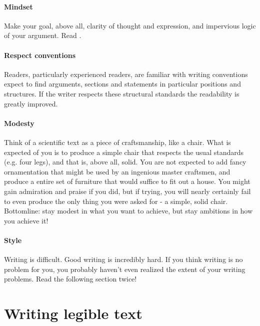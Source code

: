 \documentclass{tufte-book}
\begin{document}
\paragraph{Mindset} Make your goal, above all, clarity of thought and expression, and impervious logic of your argument. Read \citet{Woodford-Sounderthinkingthrough-1967}.

\paragraph{Respect conventions} Readers, particularly experienced readers, are familiar with writing conventions expect to find arguments, sections and statements in particular positions and structures. If the writer respects these structural standards the readability is greatly improved.


\paragraph{Modesty} Think of a scientific text as a piece of craftsmanship, like a chair. What is expected of you is to produce a simple chair that respects the usual standards (e.g. four legs), and that is, above all, solid. You are not expected to add fancy ornamentation that might be used by an ingenious master craftsmen, and produce a entire set of furniture that would suffice to fit out a house. You might gain admiration and praise if you did, but if trying, you will nearly certainly fail to even produce the only thing you were asked for - a simple, solid chair. Bottomline: stay modest in what you want to achieve, but stay ambitions in how you achieve it!


\paragraph{Style} Writing is difficult. Good writing is incredibly hard. If you think writing is no problem for you, you probably haven't even realized the extent of your writing problems. Read the following section twice!


\section{Writing legible text}
\end{document}
